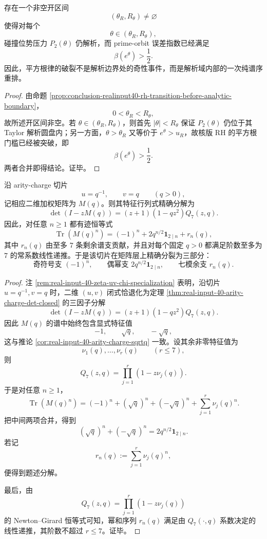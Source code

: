 \begin{corollary}[RH 型平方根失效严格发生在解析圆盘内部]\label{cor:conclusion-realinput40-rh-failure-inside-analytic-disk}
存在一个非空开区间
\[
(\theta_R,R_\theta)\neq \varnothing
\]
使得对每个
\[
\theta\in(\theta_R,R_\theta),
\]
碰撞位势压力 \(P_2(\theta)\) 仍解析，而 prime-orbit 误差指数已经满足
\[
\beta(e^\theta)>\frac12.
\]
因此，平方根律的破裂不是解析边界处的奇性事件，而是解析域内部的一次纯谱序重排。
\end{corollary}
\begin{proof}
由命题 \ref{prop:conclusion-realinput40-rh-transition-before-analytic-boundary}，
\[
0<\theta_R<R_\theta,
\]
故所述开区间非空。若 \(\theta\in(\theta_R,R_\theta)\)，则首先 \(|\theta|<R_\theta\) 保证 \(P_2(\theta)\) 仍位于其 Taylor 解析圆盘内；另一方面，\(\theta>\theta_R\) 又等价于 \(e^\theta>u_R\)，故核版 RH 的平方根门槛已经被突破，即
\[
\beta(e^\theta)>\frac12.
\]
两者合并即得结论。证毕。
\end{proof}

\begin{theorem}\label{thm:conclusion-realinput40-arity-charge-z2-trace-splitting}
沿 arity-charge 切片
\[
u=q^{-1},\qquad v=q
\qquad (q>0),
\]
记相应二维加权矩阵为 \(M(q)\)。则其特征行列式精确分解为
\[
\det(I-zM(q))=(z+1)(1-qz^2)Q_7(z,q).
\]
因此，对任意 \(n\ge 1\) 都有迹恒等式
\[
\operatorname{Tr}(M(q)^n)=(-1)^n+2q^{n/2}\mathbf 1_{2\mid n}+r_n(q),
\]
其中 \(r_n(q)\) 由至多 \(7\) 条剩余谱支贡献，并且对每个固定 \(q>0\) 都满足阶数至多为 \(7\) 的常系数线性递推。于是该切片在矩阵层上精确分裂为三部分：
\[
\text{奇符号支 }(-1)^n,\qquad
\text{偶幂支 }2q^{n/2}\mathbf 1_{2\mid n},\qquad
\text{七模余支 }r_n(q).
\]
\end{theorem}
\begin{proof}
注 \ref{rem:real-input-40-zeta-uv-chi-specialization} 表明，沿切片 \(u=q^{-1},v=q\) 时，二维 \((u,v)\) 闭式恰退化为定理 \ref{thm:real-input-40-arity-charge-det-closed} 的三因子分解
\[
\det(I-zM(q))=(z+1)(1-qz^2)Q_7(z,q).
\]
因此 \(M(q)\) 的谱中始终包含显式特征值
\[
-1,\qquad \sqrt q,\qquad -\sqrt q,
\]
这与推论 \ref{cor:real-input-40-arity-charge-sqrtq} 一致。设其余非零特征值为
\[
\nu_1(q),\dots,\nu_r(q)
\qquad (r\le 7),
\]
则
\[
Q_7(z,q)=\prod_{j=1}^{r}(1-z\nu_j(q)).
\]
于是对任意 \(n\ge 1\)，
\[
\operatorname{Tr}(M(q)^n)
=
(-1)^n+(\sqrt q)^n+(-\sqrt q)^n+\sum_{j=1}^{r}\nu_j(q)^n.
\]
把中间两项合并，得到
\[
(\sqrt q)^n+(-\sqrt q)^n=2q^{n/2}\mathbf 1_{2\mid n}.
\]
若记
\[
r_n(q):=\sum_{j=1}^{r}\nu_j(q)^n,
\]
便得到题述分解。

最后，由
\[
Q_7(z,q)=\prod_{j=1}^{r}(1-z\nu_j(q))
\]
的 Newton--Girard 恒等式可知，幂和序列 \(r_n(q)\) 满足由 \(Q_7(\cdot,q)\) 系数决定的线性递推，其阶数不超过 \(r\le 7\)。证毕。
\end{proof}

